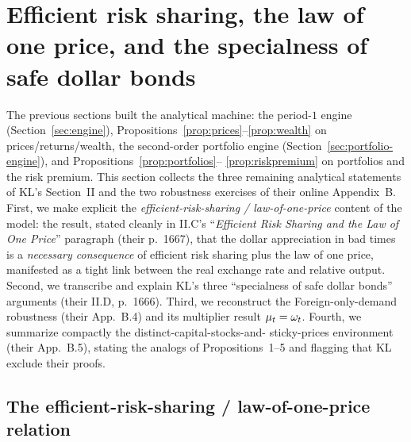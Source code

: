 \section{Efficient risk sharing, the law of one price, and the specialness of safe dollar bonds}
\label{sec:risksharing-specialness}

The previous sections built the analytical machine: the period-$1$ engine
(Section~\ref{sec:engine}), Propositions~\ref{prop:prices}--\ref{prop:wealth} on
prices/returns/wealth, the second-order portfolio engine
(Section~\ref{sec:portfolio-engine}), and Propositions~\ref{prop:portfolios}--%
\ref{prop:riskpremium} on portfolios and the risk premium. This section collects
the three remaining analytical statements of KL's Section~II and the two
robustness exercises of their online Appendix~B. First, we make explicit the
\emph{efficient-risk-sharing / law-of-one-price} content of the model: the
result, stated cleanly in II.C's ``\emph{Efficient Risk Sharing and the Law of
One Price}'' paragraph (their p.~1667), that the dollar appreciation in bad times
is a \emph{necessary consequence} of efficient risk sharing plus the law of one
price, manifested as a tight link between the real exchange rate and relative
output. Second, we transcribe and explain KL's three ``specialness of safe dollar
bonds'' arguments (their II.D, p.~1666). Third, we reconstruct the
Foreign-only-demand robustness (their App.~B.4) and its multiplier result
$\mu_t=\omega_t$. Fourth, we summarize compactly the distinct-capital-stocks-and-%
sticky-prices environment (their App.~B.5), stating the analogs of
Propositions~1--5 and flagging that KL exclude their proofs.

\subsection{The efficient-risk-sharing / law-of-one-price relation}
\label{sec:loop}

